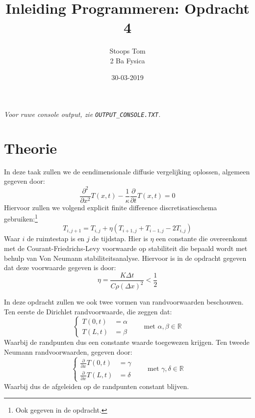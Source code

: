 \documentclass[a4paper,11pt]{article}
\title{Inleiding Programmeren: Opdracht 4}
\date{30-03-2019}
\author{Stoops Tom \\ 2 Ba Fysica}
\newcommand{\paf}[3]{\frac{\partial^{#1} #2}{\partial #3^{#1}}}
\newcommand{\p}[1]{\left(#1\right)}
\begin{document}
\maketitle

\begin{flushright}
  \textsl{Voor ruwe console output, zie \texttt{OUTPUT\_CONSOLE.TXT}.}
\end{flushright}

\section*{Theorie}
  \noindent
  In deze taak zullen we de eendimensionale diffusie vergelijking oplossen, algemeen gegeven door:
  \begin{equation}
    \paf{2}{}{x}T\p{x,t}-\frac1\kappa\paf{}{}{t}T\p{x,t} = 0
  \end{equation}
  Hiervoor zullen we volgend explicit finite difference \cite{NM} discretisatieschema gebruiken:\footnote{Ook gegeven in de opdracht.}
  \begin{equation}
    T_{i,j+1} = T_{i,j}+\eta\p{T_{i+1,j}+T_{i-1,j}-2T_{i,j}}
  \end{equation}
  Waar $i$ de ruimtestap is en $j$ de tijdstap. Hier is $\eta$ een constante die overeenkomt met de Courant-Friedrichs-Levy voorwaarde op stabiliteit die bepaald wordt met behulp van Von Neumann stabiliteitsanalyse. Hiervoor is in de opdracht gegeven dat deze voorwaarde gegeven is door:
  \begin{equation}
    \eta = \frac{K\Delta t}{C\rho\p{\Delta x}^2} < \frac12
    \label{stabiliteit}
  \end{equation}

  \noindent
  In deze opdracht zullen we ook twee vormen van randvoorwaarden beschouwen. Ten eerste de Dirichlet randvoorwaarde, die zeggen dat:
  \begin{equation}
    \left\{
    \begin{align}
      T\p{0,t} &= \alpha \\
      T\p{L,t} &= \beta
    \end{align}
    \right. \qquad\text{met } \alpha,\beta\in\mathbb{R}
  \end{equation}
  Waarbij de randpunten dus een constante waarde toegewezen krijgen. Ten tweede Neumann randvoorwaarden, gegeven door:
  \begin{equation}
    \left\{
    \begin{align}
      \paf{}{}{x}T\p{0,t} &= \gamma \\
      \paf{}{}{x}T\p{L,t} &= \delta
    \end{align}
    \right. \qquad\text{met } \gamma,\delta\in\mathbb{R}
  \end{equation}
  Waarbij dus de afgeleiden op de randpunten constant blijven.
\end{document}
